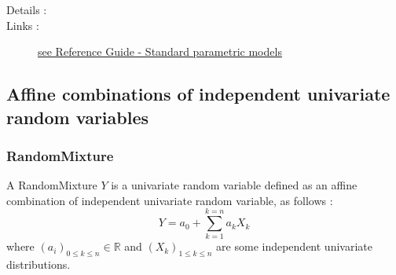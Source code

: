 \begin{description}
\item[Details :]  \rule{0pt}{1em}

\item[Links :]  \rule{0pt}{1em}
  \href{OpenTURNS_ReferenceGuide.pdf}{see Reference Guide - Standard parametric models}
\end{description}



\newpage \subsection{Affine combinations of independent univariate random variables}

\subsubsection{RandomMixture}

A RandomMixture $Y$ is a univariate random variable defined as an affine combination of independent univariate random variable, as follows :
$$
\displaystyle Y = a_0 + \sum_{k=1}^{k=n} a_k X_k
$$
where $(a_i)_{ 0 \leq k \leq n} \in \mathbb{R}$ and $(X_k)_{ 1 \leq k \leq n}$ are some independent univariate distributions.\\


